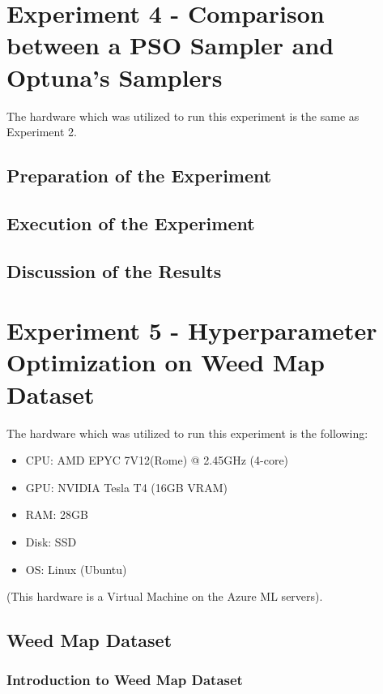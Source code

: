 \section{Experiment 4 - Comparison between a PSO Sampler and Optuna's Samplers}

The hardware which was utilized to run this experiment is the same as Experiment 2.

\subsection{Preparation of the Experiment}

\subsection{Execution of the Experiment}

\subsection{Discussion of the Results}

\section{Experiment 5 - Hyperparameter Optimization on Weed Map Dataset}

The hardware which was utilized to run this experiment is the following:
\begin{itemize}[itemsep=0.1cm]
	\item CPU: AMD EPYC 7V12(Rome) @ 2.45GHz (4-core)
	\item GPU: NVIDIA Tesla T4 (16GB VRAM)
	\item RAM: 28GB
	\item Disk: SSD
	\item OS: Linux (Ubuntu)
\end{itemize}
(This hardware is a Virtual Machine on the Azure ML servers).

\subsection{Weed Map Dataset}

\subsubsection{Introduction to Weed Map Dataset}

